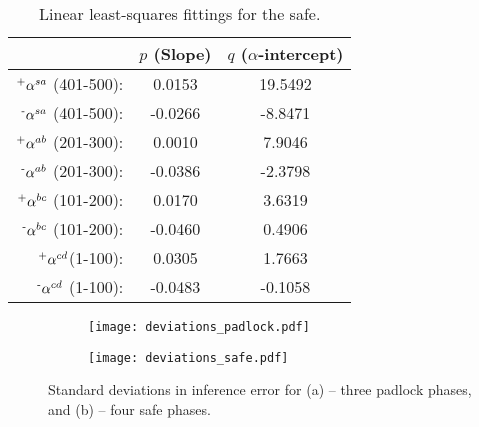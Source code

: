 \documentclass[]{IEEEtran}
\begin{document}
\begin{table}[t]
  \centering
  \scriptsize
  \caption{Linear least-squares fittings for the safe.}
    \begin{tabular}{rcc}
    \toprule
          & $p$ (Slope) & $q$ ($\alpha$-intercept) \\
    \midrule
    $\textsuperscript{+}\alpha^{sa}$ (401-500): & 0.0153 & 19.5492 \\
    $\textsuperscript{-}\alpha^{sa}$ (401-500): & -0.0266 & -8.8471 \\
    $\textsuperscript{+}\alpha^{ab}$ (201-300): & 0.0010 & 7.9046 \\
    $\textsuperscript{-}\alpha^{ab}$ (201-300): & -0.0386 & -2.3798 \\
    $\textsuperscript{+}\alpha^{bc}$ (101-200): & 0.0170 & 3.6319 \\
    $\textsuperscript{-}\alpha^{bc}$ (101-200): & -0.0460 & 0.4906 \\
    $\textsuperscript{+}\alpha^{cd}$(1-100): & 0.0305 & 1.7663 \\
    $\textsuperscript{-}\alpha^{cd}$ (1-100): & -0.0483 & -0.1058 \\
    \bottomrule
    \end{tabular}
  \label{safelines}
\end{table}

\begin{figure}[b]
\centering
\begin{subfigure}[]{0.49\linewidth}
\texttt{[image: deviations\_padlock.pdf]}
\caption{}
\label{deviations_padlock}
\end{subfigure}
\hfill
\begin{subfigure}[]{0.49\linewidth}
\texttt{[image: deviations\_safe.pdf]}
\caption{}
\label{deviations_safe}
\end{subfigure}
\caption{Standard deviations in inference error for (a) -- three padlock phases, and (b) -- four safe phases.}
\label{deviations}
\end{figure}
\end{document}
